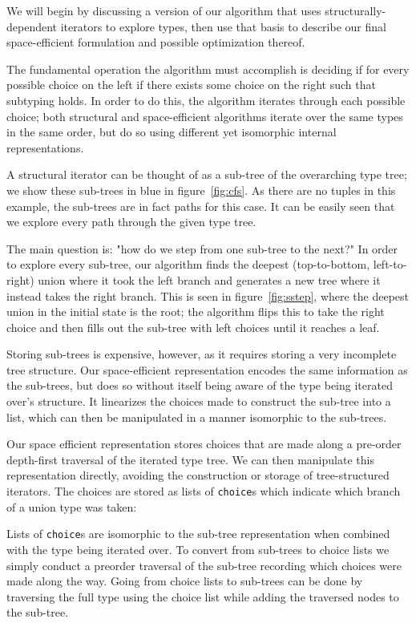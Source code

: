 \documentclass[a4paper,english]{lipics-v2019}
\begin{document}
We will begin by discussing a version of our algorithm that uses structurally-
dependent iterators to explore types, then use that basis to describe our
final space-efficient formulation and possible optimization thereof. 

The fundamental operation the algorithm must accomplish is deciding if
for every possible choice on the left if there exists some choice on the
right such that subtyping holds. In order to do this, the algorithm iterates
through each possible choice; both structural and space-efficient algorithms
iterate over the same types in the same order, but do so using different yet 
isomorphic internal representations.

A structural iterator can be thought of as a sub-tree of the overarching type
tree; we show these sub-trees in blue in figure~\ref{fig:cfs}. As there are no
tuples in this example, the sub-trees are in fact paths for this case. It can
be easily seen that we explore every path through the given type tree.

The main question is: "how do we step from one sub-tree to the next?" In order
to explore every sub-tree, our algorithm finds the deepest (top-to-bottom,
left-to-right) union where it took the left branch and generates a new tree
where it instead takes the right branch. This is seen in
figure~\ref{fig:sstep}, where the deepest union in the initial state is the
root; the algorithm flips this to take the right choice and then fills out the
sub-tree with left choices until it reaches a  leaf.

Storing sub-trees is expensive, however, as it requires storing a very
incomplete tree structure. Our space-efficient representation encodes the
same information as the sub-trees, but does so without itself being aware of
the type being iterated over's structure. It linearizes the choices made to
construct the sub-tree into a list, which can then be manipulated in a
manner isomorphic to the sub-trees.

Our space efficient representation stores choices that are made along a
pre-order depth-first traversal of the iterated type tree. We can then
manipulate this representation directly, avoiding the construction or
storage of tree-structured iterators. The choices are stored as lists of
\verb|choice|s which indicate which branch of a union type was taken:

Lists of \verb|choice|s are isomorphic to the sub-tree representation when
combined with the type being iterated over. To convert from sub-trees  to
choice lists we simply conduct a preorder traversal of the sub-tree recording
which choices were made along the way. Going from choice lists to sub-trees can
be done by traversing the full type using the choice list while adding the traversed
nodes to the sub-tree.
\end{document}
